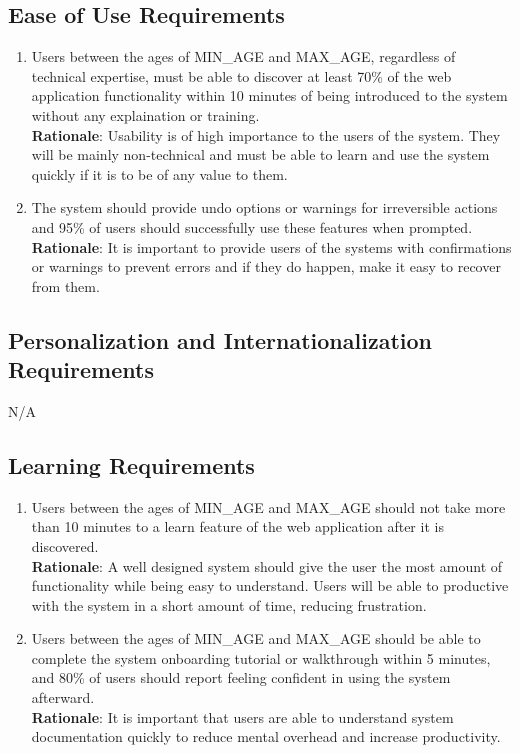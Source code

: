 \documentclass[12pt]{article}
\begin{document}
\subsection{Ease of Use Requirements}
\begin{enumerate}[{UH-EU}1.]
    \item Users between the ages of {MIN\_AGE} and {MAX\_AGE},
      regardless of technical expertise, must be able to discover at least 70\% of
      the web application functionality within 10 minutes of being introduced to
      the system without any explaination or training.\\
      \textbf{Rationale}: Usability is of high importance to the users of the system.
      They will be mainly non-technical and must be able to learn and use the
      system quickly if it is to be of any value to them.
    \item The system should provide undo options or warnings for irreversible actions
      and 95\% of users should successfully use these features when prompted.\\
      \textbf{Rationale}: It is important to provide users of the systems with
      confirmations or warnings to prevent errors and if they do happen, make it
      easy to recover from them.
\end{enumerate}
\subsection{Personalization and Internationalization Requirements}
N/A
\subsection{Learning Requirements}
\begin{enumerate}[{UH-LR}1.]
    \item Users between the ages of {MIN\_AGE} and {MAX\_AGE} should not take
      more than 10 minutes to a learn feature of the web application after it is
      discovered.\\
      \textbf{Rationale}: A well designed system should give the user the most amount of
      functionality while being easy to understand. Users will be able to
      productive with the system in a short amount of time, reducing
      frustration.
    \item Users between the ages of {MIN\_AGE} and {MAX\_AGE} should be able to 
      complete the system onboarding tutorial or walkthrough within 5 minutes,
      and 80\% of users should report feeling confident in using the system afterward.\\
      \textbf{Rationale}: It is important that users are able to understand
      system documentation quickly to reduce mental overhead and increase
      productivity.
\end{enumerate}
\end{document}
